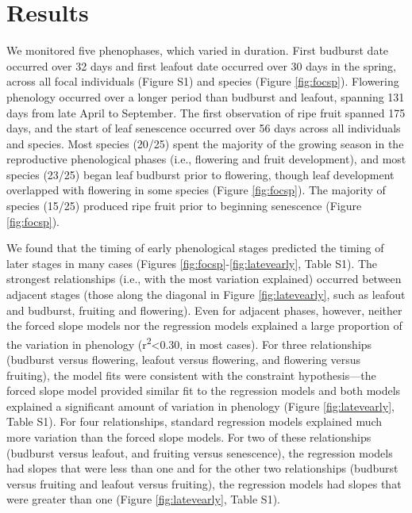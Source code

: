 \documentclass{article}
\begin{document}
\section* {Results}
\par We monitored five phenophases, which varied in duration. First budburst date occurred over 32 days and first leafout date occurred over 30 days in the spring, across all focal individuals (Figure S1) and species (Figure \ref{fig:focsp}). Flowering phenology occurred over a longer period than budburst and leafout, spanning 131 days from late April to September. The first observation of ripe fruit spanned 175 days, and the start of leaf senescence occurred over 56 days across all individuals and species. Most species (20/25) spent the majority of the growing season in the reproductive phenological phases (i.e., flowering and fruit development), and most species (23/25) began leaf budburst prior to flowering, though leaf development overlapped with flowering in some species (Figure \ref{fig:focsp}). The majority of species (15/25) produced ripe fruit prior to beginning senescence (Figure \ref{fig:focsp}).

\par We found that the timing of early phenological stages predicted the timing of later stages in many cases (Figures \ref{fig:focsp}-\ref{fig:latevearly}, Table S1). The strongest relationships (i.e., with the most variation explained) occurred between adjacent stages (those along the diagonal in Figure \ref{fig:latevearly}, such as leafout and budburst, fruiting and flowering). Even for adjacent phases, however, neither the forced slope models nor the regression models explained a large proportion of the variation in phenology (r\textsuperscript{2}<0.30, in most cases). For three relationships (budburst versus flowering, leafout versus flowering, and flowering versus fruiting), the model fits were consistent with the constraint hypothesis---the forced slope model provided similar fit to the regression models and both models explained a significant amount of variation in phenology (Figure \ref{fig:latevearly}, Table S1). For four relationships, standard regression models explained much more variation than the forced slope models.   For two of these relationships (budburst versus leafout, and fruiting versus senescence), the regression models had slopes that were less than one and for the other two relationships (budburst versus fruiting and leafout versus fruiting), the regression models had slopes that were greater than one (Figure \ref{fig:latevearly}, Table S1).
\end{document}
